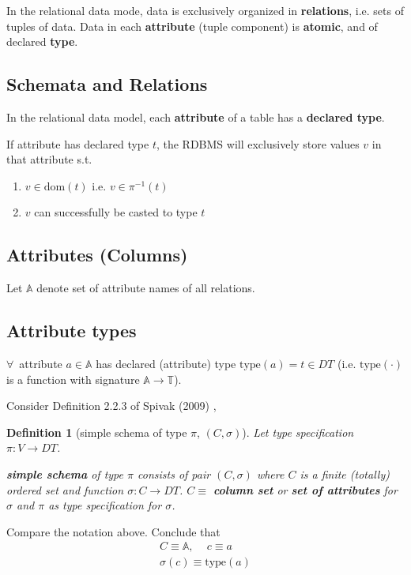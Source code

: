 \documentclass[10pt]{amsart}
\newtheorem{definition}{Definition}
\begin{document}
\begin{multicols*}{2}
In the relational data mode, data is exclusively organized in \textbf{relations}, i.e. sets of tuples of data. Data in each \textbf{attribute} (tuple component) is \textbf{atomic}, and of declared \textbf{type}.

\subsection{Schemata and Relations}

In the relational data model, each \textbf{attribute} of a table has a \textbf{declared type}.

If attribute has declared type $t$, the RDBMS will exclusively store values $v$ in that attribute s.t. 
\begin{enumerate}
	\item $v \in \text{dom}(t)$ i.e. $v \in \pi^{-1}(t)$
	\item $v$ can successfully be casted to type $t$
\end{enumerate}

\subsection{Attributes (Columns)}

Let $\mathbb{A}$ denote set of attribute names of all relations.

\subsection{Attribute types}
$\forall \, $ attribute $a\in \mathbb{A}$ has declared (attribute) type $\text{type}(a) = t\in DT$ (i.e. $\text{type}(\cdot)$ is a function with signature $\mathbb{A} \to \mathbb{T}$).

Consider Definition 2.2.3 of Spivak (2009) \cite{Spiv2009}, 

\begin{definition}[simple schema of type $\pi$, $(C,\sigma)$]
	Let type specification $\pi :V \to DT$. 
	
	\textbf{simple schema} of type $\pi$ consists of pair $(C, \sigma)$ where $C$ is a finite (totally) ordered set and function $\sigma : C \to DT$.  $C \equiv $ \textbf{column set} or \textbf{set of attributes} for $\sigma$ and $\pi$ as \emph{type specification for} $\sigma$.
\end{definition}

Compare the notation above. Conclude that
\[
\begin{gathered}
C \equiv \mathbb{A}, \quad \, c \equiv a \\
\sigma(c) \equiv \text{type}(a)
\end{gathered}
\]


\end{multicols*}
\end{document}
